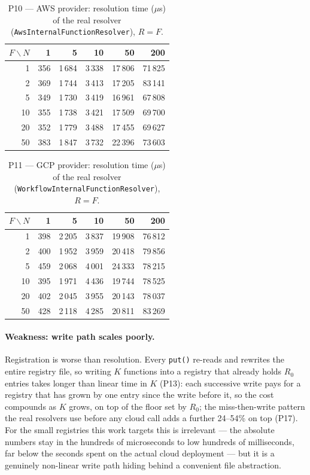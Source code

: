 \begin{table}[htbp]
  \centering
  \caption{P10 --- AWS provider: resolution time (\(\mu\)s) of the real resolver
  (\texttt{AwsInternalFunctionResolver}), $R{=}F$.}
  \label{tab:eval-p10}
  \begin{tabular}{rrrrrr}
    \hline
    $F\backslash N$ & 1 & 5 & 10 & 50 & 200 \\
    \hline
    1  & 356 & 1\,684 & 3\,338 & 17\,806 & 71\,825 \\
    2  & 369 & 1\,744 & 3\,413 & 17\,205 & 83\,141 \\
    5  & 349 & 1\,730 & 3\,419 & 16\,961 & 67\,808 \\
    10 & 355 & 1\,738 & 3\,421 & 17\,509 & 69\,700 \\
    20 & 352 & 1\,779 & 3\,488 & 17\,455 & 69\,627 \\
    50 & 383 & 1\,847 & 3\,732 & 22\,396 & 73\,603 \\
    \hline
  \end{tabular}
\end{table}

\begin{table}[htbp]
  \centering
  \caption{P11 --- GCP provider: resolution time (\(\mu\)s) of the real resolver
  (\texttt{WorkflowInternalFunctionResolver}), $R{=}F$.}
  \label{tab:eval-p11}
  \begin{tabular}{rrrrrr}
    \hline
    $F\backslash N$ & 1 & 5 & 10 & 50 & 200 \\
    \hline
    1  & 398 & 2\,205 & 3\,837 & 19\,908 & 76\,812 \\
    2  & 400 & 1\,952 & 3\,959 & 20\,418 & 79\,856 \\
    5  & 459 & 2\,068 & 4\,001 & 24\,333 & 78\,215 \\
    10 & 395 & 1\,971 & 4\,436 & 19\,744 & 78\,525 \\
    20 & 402 & 2\,045 & 3\,955 & 20\,143 & 78\,037 \\
    50 & 428 & 2\,118 & 4\,285 & 20\,811 & 83\,269 \\
    \hline
  \end{tabular}
\end{table}

\paragraph{Weakness: write path scales poorly.}
Registration is worse than resolution. Every \texttt{put()} re-reads and rewrites the entire
registry file, so writing $K$ functions into a registry that already holds $R_0$ entries takes
longer than linear time in $K$ (P13): each successive write pays for a registry that has grown by
one entry since the write before it, so the cost compounds as $K$ grows, on top of the floor set
by $R_0$; the miss-then-write pattern the real resolvers use before
any cloud call adds a further 24--54\% on top (P17). For the small registries this work targets
this is irrelevant --- the absolute numbers stay in the hundreds of microseconds to low
hundreds of milliseconds, far below the seconds spent on the actual cloud deployment --- but it
is a genuinely non-linear write path hiding behind a convenient file abstraction.

